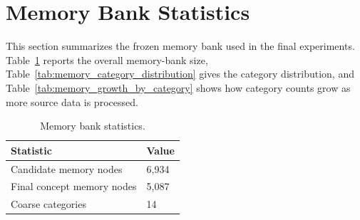 \documentclass[11pt]{article}
\begin{document}
\section{Memory Bank Statistics}
\label{sec:app_memory_stats}
This section summarizes the frozen memory bank used in the final experiments.
Table~\ref{tab:memory_bank_stats} reports the overall memory-bank size, Table~\ref{tab:memory_category_distribution} gives the category distribution, and Table~\ref{tab:memory_growth_by_category} shows how category counts grow as more source data is processed.

\begin{table}[!htbp]
\centering
\scriptsize
\setlength{\tabcolsep}{5pt}
\begin{tabular}{l l}
\hline
Statistic & Value \\
\hline
Candidate memory nodes & 6,934 \\
Final concept memory nodes & 5,087 \\
Coarse categories & 14 \\
\hline
\end{tabular}
\caption{Memory bank statistics.}
\label{tab:memory_bank_stats}
\end{table}

\begin{table}[!htbp]
\centering
\scriptsize
\setlength{\tabcolsep}{3pt}
\caption{Category distribution of the final memory bank.}
\label{tab:memory_category_distribution}
\end{table}
\end{document}
